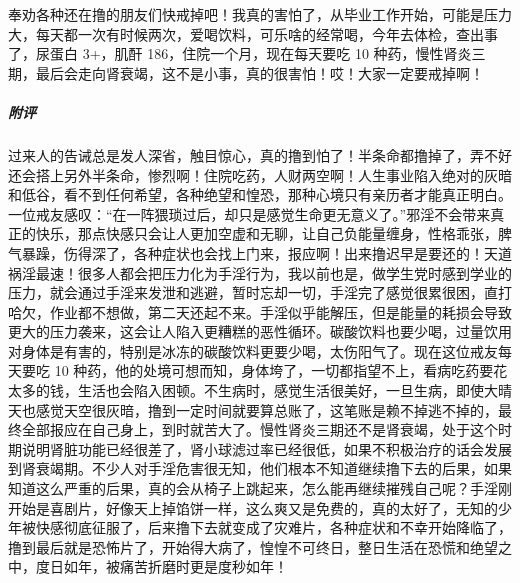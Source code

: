 \begin{case}
    奉劝各种还在撸的朋友们快戒掉吧！我真的害怕了，从毕业工作开始，可能是压力大，每天都一次有时候两次，爱喝饮料，可乐啥的经常喝，今年去体检，查出事了，尿蛋白 3+，肌酐 186，住院一个月，现在每天要吃 10 种药，慢性肾炎三期，最后会走向肾衰竭，这不是小事，真的很害怕！哎！大家一定要戒掉啊！
    \subparagraph{附评} 过来人的告诫总是发人深省，触目惊心，真的撸到怕了！半条命都撸掉了，弄不好还会搭上另外半条命，惨烈啊！住院吃药，人财两空啊！人生事业陷入绝对的灰暗和低谷，看不到任何希望，各种绝望和惶恐，那种心境只有亲历者才能真正明白。一位戒友感叹：“在一阵猥琐过后，却只是感觉生命更无意义了。”邪淫不会带来真正的快乐，那点快感只会让人更加空虚和无聊，让自己负能量缠身，性格乖张，脾气暴躁，伤得深了，各种症状也会找上门来，报应啊！出来撸迟早是要还的！天道祸淫最速！很多人都会把压力化为手淫行为，我以前也是，做学生党时感到学业的压力，就会通过手淫来发泄和逃避，暂时忘却一切，手淫完了感觉很累很困，直打哈欠，作业都不想做，第二天还起不来。手淫似乎能解压，但是能量的耗损会导致更大的压力袭来，这会让人陷入更糟糕的恶性循环。碳酸饮料也要少喝，过量饮用对身体是有害的，特别是冰冻的碳酸饮料更要少喝，太伤阳气了。现在这位戒友每天要吃 10 种药，他的处境可想而知，身体垮了，一切都指望不上，看病吃药要花太多的钱，生活也会陷入困顿。不生病时，感觉生活很美好，一旦生病，即使大晴天也感觉天空很灰暗，撸到一定时间就要算总账了，这笔账是赖不掉逃不掉的，最终全部报应在自己身上，到时就苦大了。慢性肾炎三期还不是肾衰竭，处于这个时期说明肾脏功能已经很差了，肾小球滤过率已经很低，如果不积极治疗的话会发展到肾衰竭期。不少人对手淫危害很无知，他们根本不知道继续撸下去的后果，如果知道这么严重的后果，真的会从椅子上跳起来，怎么能再继续摧残自己呢？手淫刚开始是喜剧片，好像天上掉馅饼一样，这么爽又是免费的，真的太好了，无知的少年被快感彻底征服了，后来撸下去就变成了灾难片，各种症状和不幸开始降临了，撸到最后就是恐怖片了，开始得大病了，惶惶不可终日，整日生活在恐慌和绝望之中，度日如年，被痛苦折磨时更是度秒如年！


\end{case}
